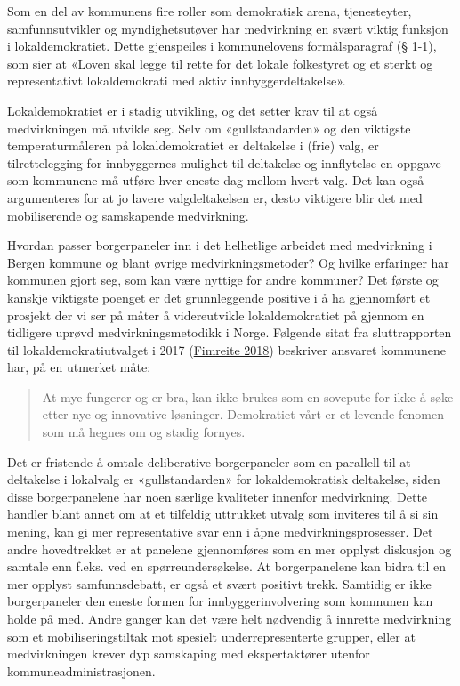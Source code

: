 \documentclass[
  12pt,
  a4paper, 12pt]{article}
\begin{document}
Som en del av kommunens fire roller som demokratisk arena, tjenesteyter, samfunnsutvikler og myndighetsutøver har medvirkning en svært viktig funksjon i lokaldemokratiet. Dette gjenspeiles i kommunelovens formålsparagraf (§ 1-1), som sier at «Loven skal legge til rette for det lokale folkestyret og et sterkt og representativt lokaldemokrati med aktiv innbyggerdeltakelse».

Lokaldemokratiet er i stadig utvikling, og det setter krav til at også medvirkningen må utvikle seg. Selv om «gullstandarden» og den viktigste temperaturmåleren på lokaldemokratiet er deltakelse i (frie) valg, er tilrettelegging for innbyggernes mulighet til deltakelse og innflytelse en oppgave som kommunene må utføre hver eneste dag mellom hvert valg. Det kan også argumenteres for at jo lavere valgdeltakelsen er, desto viktigere blir det med mobiliserende og samskapende medvirkning.

Hvordan passer borgerpaneler inn i det helhetlige arbeidet med medvirkning i Bergen kommune og blant øvrige medvirkningsmetoder? Og hvilke erfaringer har kommunen gjort seg, som kan være nyttige for andre kommuner? Det første og kanskje viktigste poenget er det grunnleggende positive i å ha gjennomført et prosjekt der vi ser på måter å videreutvikle lokaldemokratiet på gjennom en tidligere uprøvd medvirkningsmetodikk i Norge. Følgende sitat fra sluttrapporten til lokaldemokratiutvalget i 2017 (\protect\hyperlink{ref-fimreitebyen}{Fimreite 2018}) beskriver ansvaret kommunene har, på en utmerket måte:

\begin{quote}
At mye fungerer og er bra, kan ikke brukes som en sovepute for ikke å søke etter nye og innovative løsninger. Demokratiet vårt er et levende fenomen som må hegnes om og stadig fornyes.
\end{quote}

Det er fristende å omtale deliberative borgerpaneler som en parallell til at deltakelse i lokalvalg er «gullstandarden» for lokaldemokratisk deltakelse, siden disse borgerpanelene har noen særlige kvaliteter innenfor medvirkning. Dette handler blant annet om at et tilfeldig uttrukket utvalg som inviteres til å si sin mening, kan gi mer representative svar enn i åpne medvirkningsprosesser. Det andre hovedtrekket er at panelene gjennomføres som en mer opplyst diskusjon og samtale enn f.eks. ved en spørreundersøkelse. At borgerpanelene kan bidra til en mer opplyst samfunnsdebatt, er også et svært positivt trekk. Samtidig er ikke borgerpaneler den eneste formen for innbyggerinvolvering som kommunen kan holde på med. Andre ganger kan det være helt nødvendig å innrette medvirkning som et mobiliseringstiltak mot spesielt underrepresenterte grupper, eller at medvirkningen krever dyp samskaping med ekspertaktører utenfor kommuneadministrasjonen.
\end{document}
